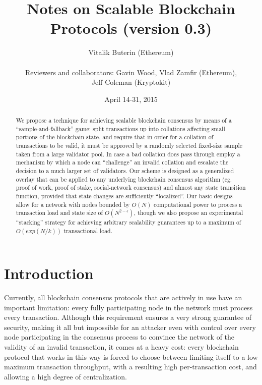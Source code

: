 \documentclass[11pt,a4paper]{article}
\theoremstyle{plain}
\theoremstyle{definition}
\theoremstyle{remark}
\begin{document}
\title{Notes on Scalable Blockchain Protocols (version 0.3)}
\date{April 14-31, 2015}
\author{Vitalik Buterin (Ethereum) \\  \\ Reviewers and collaborators: Gavin Wood, Vlad Zamfir (Ethereum), \\ Jeff Coleman (Kryptokit)}

\maketitle

\begin{abstract}
We propose a technique for achieving scalable blockchain consensus by means of a ``sample-and-fallback'' game: split transactions up into collations affecting small portions of the blockchain state, and require that in order for a collation of transactions to be valid, it must be approved by a randomly selected fixed-size sample taken from a large validator pool. In case a bad collation does pass through employ a mechanism by which a node can ``challenge'' an invalid collation and escalate the decision to a much larger set of validators. Our scheme is designed as a generalized overlay that can be applied to any underlying blockchain consensus algorithm (eg. proof of work, proof of stake, social-network consensus) and almost any state transition function, provided that state changes are sufficiently ``localized''. Our basic designs allow for a network with nodes bounded by $O(N)$ computational power to process a transaction load and state size of $O(N^{2-\epsilon})$, though we also propose an experimental ``stacking'' strategy for achieving arbitrary scalability guarantees up to a maximum of $O(exp(N/k))$ transactional load.
\end{abstract}

\section{Introduction}

Currently, all blockchain consensus protocols that are actively in use have an important limitation: every fully participating node in the network must process every transaction. Although this requirement ensures a very strong guarantee of security, making it all but impossible for an attacker even with control over every node participating in the consensus process to convince the network of the validity of an invalid transaction, it comes at a heavy cost: every blockchain protocol that works in this way is forced to choose between limiting itself to a low maximum transaction throughput, with a resulting high per-transaction cost, and allowing a high degree of centralization.
\end{document}
